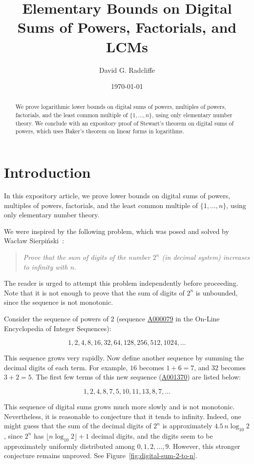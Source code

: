 \documentclass[12pt]{amsart}
\title{Elementary Bounds on Digital Sums of Powers, Factorials, and LCMs}
\author{David G. Radcliffe}
\date{\today}
\theoremstyle{remark}
\begin{document}
\begin{abstract}
    We prove logarithmic lower bounds on digital sums of powers, multiples of powers, factorials,
    and the least common multiple of $\{1,\ldots, n\}$, using only elementary number theory.
    We conclude with an expository proof of Stewart's theorem on digital sums of powers,
    which uses Baker's theorem on linear forms in logarithms.
\end{abstract}

\maketitle

\section{Introduction} \label{sec:introduction}
In this expository article, we prove lower bounds on digital sums
of powers, multiples of powers, factorials, and the least common
multiple of $\{1,\ldots, n\}$, using only elementary number theory.

We were inspired by the following problem, which was posed and solved
by Wac{\l}aw Sierpi{\'n}ski~\cite[Problem 209]{sierpinski1970}:
\begin{quote}
    \emph{Prove that the sum of digits of the number $2^n$ (in decimal system)
        increases to infinity with $n$.}
\end{quote}

The reader is urged to attempt this problem independently before proceeding.
Note that it is not enough to prove that the sum of digits of $2^n$ is
unbounded, since the sequence is not monotonic.

Consider the sequence of powers of $2$ (sequence \href{https://oeis.org/A000079}{A000079}
in the On-Line Encyclopedia of Integer Sequences):

\[
    1, 2, 4, 8, 16, 32, 64, 128, 256, 512, 1024, \ldots
\]

This sequence grows very rapidly. Now define another sequence by summing
the decimal digits of each term. For example, $16$ becomes $1+6=7$, and $32$
becomes $3+2=5$. 
The first few terms of this new sequence (\href{https://oeis.org/A001370}{A001370}) are listed below:

\[
    1, 2, 4, 8, 7, 5, 10, 11, 13, 8, 7, \ldots
\]

This sequence of digital sums grows much more slowly and is not monotonic.
Nevertheless, it is reasonable to conjecture that it tends to infinity.
Indeed, one might guess that the sum of the decimal digits of $2^n$
is approximately $4.5\, n \log_{10}2$,
since $2^n$ has $\lfloor n \log_{10}2\rfloor + 1$ decimal digits,
and the digits seem to be approximately uniformly distributed among
$0, 1, 2, \ldots, 9$.
However, this stronger conjecture remains unproved.
See Figure~\ref{fig:digital-sum-2-to-n}.
\end{document}
